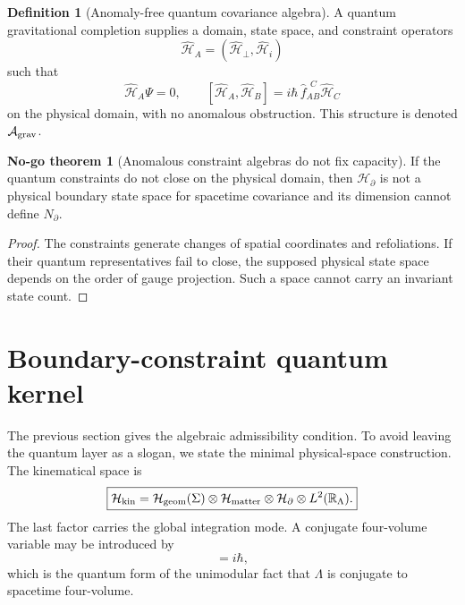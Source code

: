 \documentclass[aps,prd,reprint,nofootinbib,superscriptaddress,floatfix]{revtex4-2}
\numberwithin{equation}{section}
\theoremstyle{definition}
\newtheorem{definition}{Definition}[section]
\newtheorem{nogotheorem}{No-go theorem}[section]
\theoremstyle{plain}
\newcommand{\R}{\mathbb R}
\newcommand{\Agrav}{\mathcal A_{\rm grav}}
\newcommand{\Ncap}{N_{\partial}}
\newcommand{\Hkin}{\mathcal H_{\rm kin}}
\newcommand{\Hbd}{\mathcal H_{\partial}}
\newcommand{\Tfour}{\mathcal T_4}
\begin{document}
\begin{definition}[Anomaly-free quantum covariance algebra]\label{def:agrav}
A quantum gravitational completion supplies a domain, state space, and constraint operators
\begin{equation}
\widehat{\mathcal H}_A=(\widehat{\mathcal H}_\perp,\widehat{\mathcal H}_i)
\end{equation}
such that
\begin{equation}
\boxed{
\widehat{\mathcal H}_A\Psi=0,
\qquad
[\widehat{\mathcal H}_A,\widehat{\mathcal H}_B]
=
i\hbar\,\widehat f_{AB}^{\ \ C}\widehat{\mathcal H}_C
}
\end{equation}
on the physical domain, with no anomalous obstruction.  This structure is denoted \(\Agrav\).
\end{definition}

\begin{nogotheorem}[Anomalous constraint algebras do not fix capacity]\label{nogo:anomaly}
If the quantum constraints do not close on the physical domain, then \(\mathcal H_\partial\) is not a physical boundary state space for spacetime covariance and its dimension cannot define \(\Ncap\).
\end{nogotheorem}

\begin{proof}
The constraints generate changes of spatial coordinates and refoliations.  If their quantum representatives fail to close, the supposed physical state space depends on the order of gauge projection.  Such a space cannot carry an invariant state count.
\end{proof}


\section{Boundary-constraint quantum kernel}\label{sec:quantum-kernel}

The previous section gives the algebraic admissibility condition.  To avoid leaving the quantum layer as a slogan, we state the minimal physical-space construction.  The kinematical space is
\begin{equation}
\boxed{
\Hkin=
\mathcal H_{\rm geom}(\Sigma)
\otimes
\mathcal H_{\rm matter}
\otimes
\Hbd
\otimes
L^2(\R_\Lambda).
}
\end{equation}
The last factor carries the global integration mode.  A conjugate four-volume variable may be introduced by
\begin{equation}
[\widehat{\Tfour},\widehat\Lambda]=i\hbar,
\end{equation}
which is the quantum form of the unimodular fact that \(\Lambda\) is conjugate to spacetime four-volume.
\end{document}
